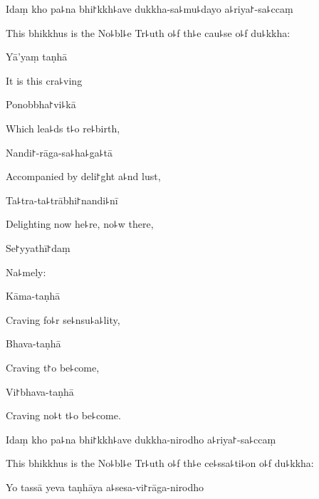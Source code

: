 Idaṃ kho pa꜕na bhi꜓kkh꜕ave dukkha-sa꜕mu꜕dayo a꜕riya꜓-sa꜕ccaṃ

\begin{english}
  This bhikkhus is the No꜕bl꜕e Tr꜕uth o꜕f th꜕e cau꜕se o꜕f du꜕kkha:
\end{english}

Yā'yaṃ taṇhā

\begin{english}
  It is this cra꜕ving
\end{english}

Ponobbha꜓vi꜕kā

\begin{english}
  Which lea꜕ds t꜕o re꜕birth,
\end{english}

Nandi꜓-rāga-sa꜕ha꜕ga꜕tā

\begin{english}
  Accompanied by deli꜓ght a꜕nd lust,
\end{english}

Ta꜕tra-ta꜕trābhi꜓nandi꜕nī

\begin{english}
  Delighting now he꜕re, no꜕w there,
\end{english}

Se꜓yyathī꜓daṃ

\begin{english}
  Na꜕mely:
\end{english}

\ifaivedition
\clearpage
\fi

Kāma-taṇhā

\begin{english}
  Craving fo꜕r se꜕nsu꜕a꜕lity,
\end{english}

Bhava-taṇhā

\begin{english}
  Craving t꜓o be꜕come,
\end{english}

Vi꜓bhava-taṇhā

\begin{english}
  Craving no꜕t t꜕o be꜕come.
\end{english}

Idaṃ kho pa꜕na bhi꜓kkh꜕ave dukkha-nirodho a꜕riya꜓-sa꜕ccaṃ

\begin{english}
  This bhikkhus is the No꜕bl꜕e Tr꜕uth o꜕f th꜕e ce꜕ssa꜕ti꜕on o꜕f du꜕kkha:
\end{english}

Yo tassā yeva taṇhāya a꜕sesa-vi꜓rāga-nirodho

